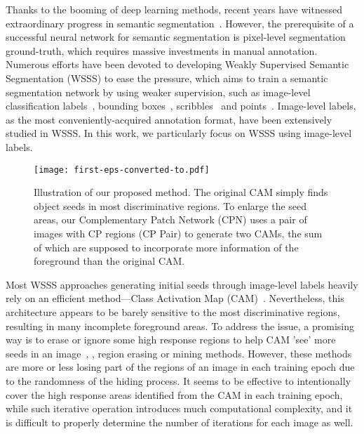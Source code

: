\documentclass[10pt,twocolumn,letterpaper]{article}
\begin{document}
Thanks to the booming of deep learning methods, recent years have witnessed extraordinary progress in semantic segmentation~\cite{fcn,psp,v2,v3plus}. However, the prerequisite of a successful neural network for semantic segmentation is pixel-level segmentation ground-truth, which requires massive investments in manual annotation. Numerous efforts have been devoted to developing Weakly Supervised Semantic Segmentation (WSSS) to ease the pressure, which aims to train a semantic segmentation network by using weaker supervision, such as image-level classification labels~\cite{sec,subE,affinity,1stage}, bounding boxes~\cite{bbox1,bbox2}, scribbles~\cite{scribble} and points~\cite{point}. Image-level labels, as the most conveniently-acquired annotation format, have been extensively studied in WSSS. In this work, we particularly focus on WSSS using image-level labels.
\begin{figure}
\begin{center}
\texttt{[image: first-eps-converted-to.pdf]} \end{center}
\vspace{-3mm}
   \caption{Illustration of our proposed method. The original CAM simply finds object seeds in most discriminative regions. To enlarge the seed areas, our Complementary Patch Network (CPN) uses a pair of images with CP regions (CP Pair) to generate two CAMs, the sum of which are supposed to incorporate more information of the foreground than the original CAM.}

\label{fig:first}
\end{figure}

Most WSSS approaches generating initial seeds through image-level labels heavily rely on an efficient method---Class Activation Map (CAM)~\cite{cam}.
Nevertheless, this architecture appears to be barely sensitive to the most discriminative regions, resulting in many incomplete foreground areas. To address the issue, a promising way is to erase or ignore some high response regions to help CAM 'see' more seeds in an image~\cite{erase1,fickle,has,adl}, \ie, region erasing or mining methods. However, these methods are more or less losing part of the regions of an image in each training epoch due to the randomness of the hiding process. It seems to be effective to intentionally cover the high response areas identified from the CAM in each training epoch, while such iterative operation introduces much computational complexity, and it is difficult to properly determine the number of iterations for each image as well.
\end{document}
